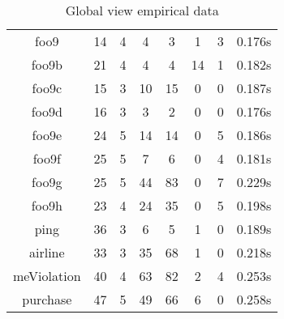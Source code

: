 \begin{table}[!ht]
\begin{tabular}{|c|c|c|c|c|c|c|c|}
foo9 & 14 & 4 & 4 & 3 & 1 & 3 & 0.176s \\ 
foo9b & 21 & 4 & 4 & 4 & 14 & 1 & 0.182s \\ 
foo9c & 15 & 3 & 10 & 15 & 0 & 0 & 0.187s \\ 
foo9d & 16 & 3 & 3 & 2 & 0 & 0 & 0.176s \\ 
foo9e & 24 & 5 & 14 & 14 & 0 & 5 & 0.186s \\ 
foo9f & 25 & 5 & 7 & 6 & 0 & 4 & 0.181s \\ 
foo9g & 25 & 5 & 44 & 83 & 0 & 7 & 0.229s \\ 
foo9h & 23 & 4 & 24 & 35 & 0 & 5 & 0.198s \\ 
ping & 36 & 3 & 6 & 5 & 1 & 0 & 0.189s \\ 
airline & 33 & 3 & 35 & 68 & 1 & 0 & 0.218s \\ 
meViolation & 40 & 4 & 63 & 82 & 2 & 4 & 0.253s \\ 
purchase & 47 & 5 & 49 & 66 & 6 & 0 & 0.258s \\ 
\hline
\end{tabular}
\caption{Global view empirical data}
\label{tab:gvbench}
\end{table}